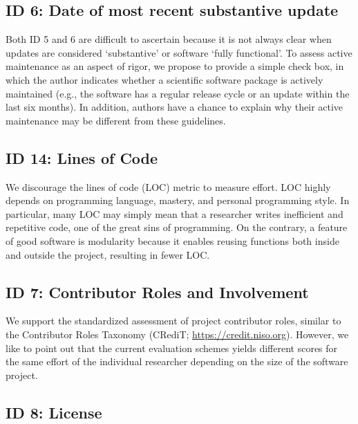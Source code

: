 \documentclass[
  man]{apa6}
\begin{document}
\hypertarget{id-6-date-of-most-recent-substantive-update}{%
\subsection{ID 6: Date of most recent substantive update}\label{id-6-date-of-most-recent-substantive-update}}

Both ID 5 and 6 are difficult to ascertain because it is not always clear when updates are considered `substantive' or software `fully functional'.
To assess active maintenance as an aspect of rigor, we propose to provide a simple check box, in which the author indicates whether a scientific software package is actively maintained (e.g., the software has a regular release cycle or an update within the last six months).
In addition, authors have a chance to explain why their active maintenance may be different from these guidelines.

\hypertarget{id-14-lines-of-code}{%
\subsection{ID 14: Lines of Code}\label{id-14-lines-of-code}}

We discourage the lines of code (LOC) metric to measure effort.
LOC highly depends on programming language, mastery, and personal programming style.
In particular, many LOC may simply mean that a researcher writes inefficient and repetitive code, one of the great sins of programming.
On the contrary, a feature of good software is modularity because it enables reusing functions both inside and outside the project, resulting in fewer LOC.

\hypertarget{id-7-contributor-roles-and-involvement}{%
\subsection{ID 7: Contributor Roles and Involvement}\label{id-7-contributor-roles-and-involvement}}

We support the standardized assessment of project contributor roles, similar to the Contributor Roles Taxonomy (CRediT; \url{https://credit.niso.org}).
However, we like to point out that the current evaluation schemes yields different scores for the same effort of the individual researcher depending on the size of the software project.

\hypertarget{id-8-license}{%
\subsection{ID 8: License}\label{id-8-license}}
\end{document}
